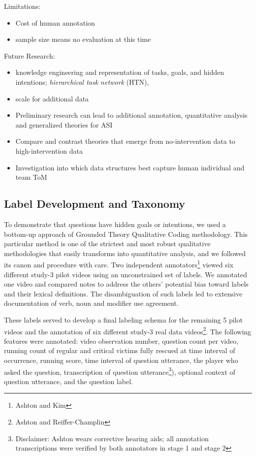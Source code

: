 \documentclass[10pt]{article}
\begin{document}
Limitations:
\begin{itemize}
    \item Cost of human annotation
    \item sample size means no evaluation at this time
\end{itemize}

Future Research:
\begin{itemize}
    \item knowledge engineering and representation of tasks, goals, and hidden intentions;  \emph{hierarchical task network} (HTN),
    \item scale for additional data
    \item Preliminary research can lead to additional annotation, quantitative analysis and generalized theories for ASI
    \item Compare and contrast theories that emerge from no-intervention data to high-intervention data
    \item Investigation into which data structures best capture human individual and team ToM
\end{itemize}








\vspace{300pt}
\subsection{Label Development and Taxonomy}

To demonstrate that questions have hidden goals or intentions, we used a bottom-up approach of Grounded Theory Qualitative Coding methodology. This particular method is one of the strictest and most robust qualitative methodologies that easily transforms into quantitative analysis, and we followed its canon and procedure with care. Two independent annotators\footnote{Ashton and Kim} viewed six different study-3 pilot videos using an unconstrained set of labels. We annotated one video and compared notes to address the others' potential bias toward labels and their lexical definitions. The disambiguation of such labels led to extensive documentation of verb, noun and modifier use agreement. 

These labels served to develop a final labeling schema for the remaining 5 pilot videos and the annotation of six different study-3 real data videos\footnote{Ashton and Reiffer-Champlin}. The following features were annotated: video observation number, question count per video, running count of regular and critical victims fully rescued at time interval of occurrence, running score, time interval of question utterance, the player who asked the question, transcription of question utterance\footnote{Disclaimer: Ashton wears corrective hearing aids; all annotation transcriptions were verified by both annotators in stage 1 and stage 2}), optional context of question utterance, and the question label. 
\end{document}

